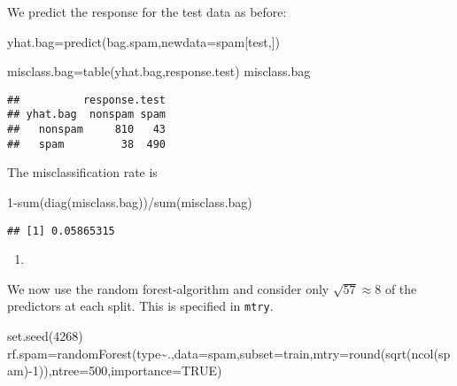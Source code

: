 \documentclass[
]{article}
\newenvironment{Shaded}{\begin{snugshade}}{\end{snugshade}}
\newcommand{\AttributeTok}[1]{\textcolor[rgb]{0.77,0.63,0.00}{#1}}
\newcommand{\ConstantTok}[1]{\textcolor[rgb]{0.00,0.00,0.00}{#1}}
\newcommand{\DecValTok}[1]{\textcolor[rgb]{0.00,0.00,0.81}{#1}}
\newcommand{\FunctionTok}[1]{\textcolor[rgb]{0.00,0.00,0.00}{#1}}
\newcommand{\NormalTok}[1]{#1}
\newcommand{\OtherTok}[1]{\textcolor[rgb]{0.56,0.35,0.01}{#1}}
\newcommand{\SpecialCharTok}[1]{\textcolor[rgb]{0.00,0.00,0.00}{#1}}
\providecommand{\tightlist}{%
  \setlength{\itemsep}{0pt}\setlength{\parskip}{0pt}}
\begin{document}
We predict the response for the test data as before:

\begin{Shaded}
\begin{Highlighting}[]
\NormalTok{yhat.bag}\OtherTok{=}\FunctionTok{predict}\NormalTok{(bag.spam,}\AttributeTok{newdata=}\NormalTok{spam[test,])}

\NormalTok{misclass.bag}\OtherTok{=}\FunctionTok{table}\NormalTok{(yhat.bag,response.test)}
\NormalTok{misclass.bag}
\end{Highlighting}
\end{Shaded}

\begin{verbatim}
##          response.test
## yhat.bag  nonspam spam
##   nonspam     810   43
##   spam         38  490
\end{verbatim}

The misclassification rate is

\begin{Shaded}
\begin{Highlighting}[]
\DecValTok{1}\SpecialCharTok{{-}}\FunctionTok{sum}\NormalTok{(}\FunctionTok{diag}\NormalTok{(misclass.bag))}\SpecialCharTok{/}\FunctionTok{sum}\NormalTok{(misclass.bag)}
\end{Highlighting}
\end{Shaded}

\begin{verbatim}
## [1] 0.05865315
\end{verbatim}

\begin{enumerate}
\def\labelenumi{\alph{enumi})}
\setcounter{enumi}{6}
\tightlist
\item
\end{enumerate}

We now use the random forest-algorithm and consider only
\(\sqrt{57}\approx 8\) of the predictors at each split. This is
specified in \texttt{mtry}.

\begin{Shaded}
\begin{Highlighting}[]
\FunctionTok{set.seed}\NormalTok{(}\DecValTok{4268}\NormalTok{)}
\NormalTok{rf.spam}\OtherTok{=}\FunctionTok{randomForest}\NormalTok{(type}\SpecialCharTok{\textasciitilde{}}\NormalTok{.,}\AttributeTok{data=}\NormalTok{spam,}\AttributeTok{subset=}\NormalTok{train,}\AttributeTok{mtry=}\FunctionTok{round}\NormalTok{(}\FunctionTok{sqrt}\NormalTok{(}\FunctionTok{ncol}\NormalTok{(spam)}\SpecialCharTok{{-}}\DecValTok{1}\NormalTok{)),}\AttributeTok{ntree=}\DecValTok{500}\NormalTok{,}\AttributeTok{importance=}\ConstantTok{TRUE}\NormalTok{)}
\end{Highlighting}
\end{Shaded}
\end{document}
